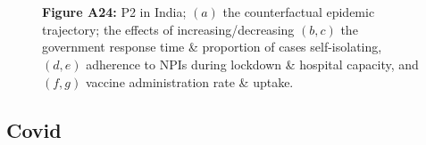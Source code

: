 \documentclass[paper=a4,fontsize=11pt]{article}
\begin{document}
\begin{figure}[!h]
  \\
  \hspace{1.76cm}
  \\
  \caption*{\textbf{Figure A24:} P2 in India; $(a)$ the counterfactual epidemic trajectory; the effects of increasing/decreasing $(b,c)$ the government response time \& proportion of cases self-isolating, $(d,e)$ adherence to NPIs during lockdown \& hospital capacity, and $(f,g)$ vaccine administration rate \& uptake.}
\end{figure}


\subsection{Covid}
\end{document}
